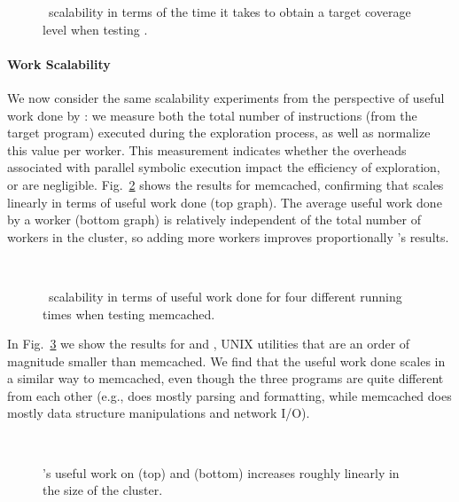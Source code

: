\begin{figure}[h!]
  \centering
  \caption{\cnine\ scalability in terms of the time it takes to obtain a target coverage level when testing .}
  \label{fig:scalab-time-vs-workers-cov}
\end{figure}

\paragraph{Work Scalability} We now consider the same scalability experiments from the perspective of useful work done by \cnine: we measure both the total number of instructions (from the target program) executed during the exploration process, as well as normalize this value per worker. This measurement indicates whether the overheads associated with parallel symbolic execution impact the efficiency of exploration, or are negligible. Fig.~\ref{fig:scalab-memcached} shows the results for memcached, confirming that \cnine scales linearly in terms of useful work done (top graph).  The average useful work done by a worker (bottom graph) is relatively independent of the total number of workers in the cluster, so adding more workers improves proportionally \cnine's results.

\begin{figure}[t!]
  \centering
   \\
  \caption{\cnine\ scalability in terms of useful work done for four different running times when testing memcached.}
  \label{fig:scalab-memcached}
\end{figure}

In Fig.~\ref{fig:scalab} we show the results for  and , UNIX utilities that are an order of magnitude smaller than memcached. We find that the useful work done scales in a similar way to memcached, even though the three programs are quite different from each other (e.g.,  does mostly parsing and formatting, while memcached does mostly data structure manipulations and network I/O).


\begin{figure}[h!]
  \centering
   \\
  \caption{\cnine's useful work on  (top) and  (bottom) increases roughly linearly in the size of the cluster.}  
  \label{fig:scalab}
\end{figure}

